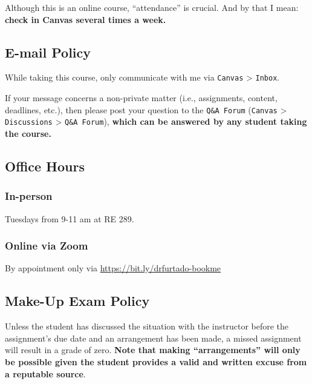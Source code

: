 \documentclass[
  letterpaper,
  DIV=11,
  numbers=noendperiod,
  oneside]{scrartcl}
\begin{document}
Although this is an online course, ``attendance'' is crucial. And by
that I mean: \textbf{check in Canvas several times a week.}

\hypertarget{e-mail-policy}{%
\subsection{E-mail Policy}\label{e-mail-policy}}

While taking this course, only communicate with me via \texttt{Canvas}
\textgreater{} \texttt{Inbox}.

If your message concerns a non-private matter (i.e., assignments,
content, deadlines, etc.), then please post your question to the
\texttt{Q\&A\ Forum} (\texttt{Canvas} \textgreater{}
\texttt{Discussions} \textgreater{} \texttt{Q\&A\ Forum}), \textbf{which
can be answered by any student taking the course.}

\hypertarget{sec-office-hours}{%
\subsection{Office Hours}\label{sec-office-hours}}

\hypertarget{in-person}{%
\subsubsection{In-person}\label{in-person}}

Tuesdays from 9-11 am at RE 289.

\hypertarget{online-via-zoom}{%
\subsubsection{Online via Zoom}\label{online-via-zoom}}

By appointment only via \url{https://bit.ly/drfurtado-bookme}

\hypertarget{make-up-exam-policy}{%
\subsection{Make-Up Exam Policy}\label{make-up-exam-policy}}

Unless the student has discussed the situation with the instructor
before the assignment's due date and an arrangement has been made, a
missed assignment will result in a grade of zero. \textbf{Note that
making ``arrangements'' will only be possible given the student provides
a valid and written excuse from a reputable source}.
\end{document}
